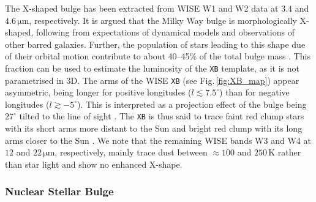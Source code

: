 \documentclass[doublespace,nopageskip]{VTthesis} %
\newcommand{\mrm}[1]{\mathrm{#1}}
\begin{document}
The X-shaped bulge \citep[\texttt{XB},][]{2016AJ....152...14N} has been extracted from WISE W1 and W2 data at $3.4$ and $4.6\,\mrm{\mu m}$, respectively.
%
It is argued that the Milky Way bulge is morphologically X-shaped, following from expectations of dynamical models and observations of other barred galaxies.
%
Further, the population of stars leading to this shape due of their orbital motion contribute to about 40--45\% of the total bulge mass \citep{2015MNRAS.450L..66P}.
%
This fraction can be used to estimate the luminosity of the \texttt{XB} template, as it is not parametrised in 3D.
%
The arms of the WISE \texttt{XB} (see Fig.\,\ref{fig:XB_map}) appear asymmetric, being longer for positive longitudes ($l \lesssim 7.5^{\circ}$) than for negative longitudes ($l \gtrsim -5^{\circ}$).
%
This is interpreted as a projection effect of the bulge being $27^{\circ}$ tilted to the line of sight \citep{2013MNRAS.435.1874W}.
%
The \texttt{XB} is thus said to trace faint red clump stars with its short arms more distant to the Sun and bright red clump with its long arms closer to the Sun \cite[][cf. discussion about the `double red clump' of the Milky Way]{2018ApJ...862L...8L}.
%
We note that the remaining WISE bands W3 and W4 at $12$ and $22\,\mrm{\mu m}$, respectively, mainly trace dust between $\approx 100$ and $250\,\mrm{K}$ rather than star light and show no enhanced X-shape.


\subsubsection{Nuclear Stellar Bulge}
\end{document}
